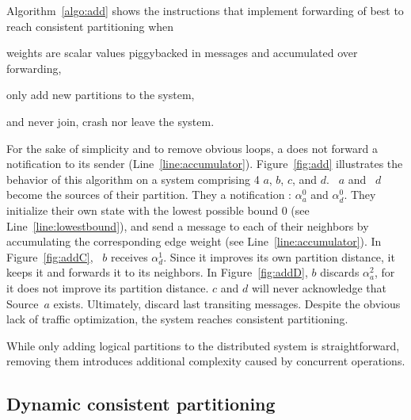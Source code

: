 Algorithm~\ref{algo:add} shows the instructions that implement
forwarding of best to reach consistent partitioning when
\begin{inparaenum}[(i)]
\item weights are scalar values piggybacked in messages and
  accumulated over forwarding,
\item \processes only add new partitions to the system,
\item and \processes never join, crash nor leave the system.
\end{inparaenum}
For the sake of simplicity and to remove obvious loops, a \process
does not forward a notification to its sender
(Line~\ref{line:accumulator}).  Figure~\ref{fig:add} illustrates the
behavior of this algorithm on a system comprising 4 \processes $a$,
$b$, $c$, and $d$. \Process~$a$ and \Process~$d$ become the sources of
their partition.  They \NAMEB a notification : $\alpha_a^0$ and $\alpha_d^0$. They initialize their own
state with the lowest possible bound $0$ (see
Line~\ref{line:lowestbound}), and send a message to each of their
neighbors by accumulating the corresponding edge weight (see
Line~\ref{line:accumulator}). In Figure~\ref{fig:addC}, \Process~$b$
receives $\alpha_{d}^{1}$. Since it improves its own partition
distance, it keeps it and forwards it to its neighbors. In
Figure~\ref{fig:addD}, $b$ discards $\alpha_{a}^{2}$, for it does not
improve its partition distance. \Processes $c$ and $d$ will never
acknowledge that Source~$a$ exists. Ultimately, \processes discard
last transiting messages. Despite the obvious lack of traffic
optimization, the system reaches consistent partitioning.

While only adding logical partitions to the distributed system is
straightforward, removing them introduces additional complexity caused
by concurrent operations.

\subsection{Dynamic consistent partitioning}
\label{subsec:dynamic}


